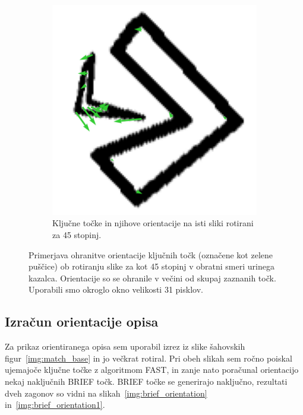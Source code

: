 \documentclass[a4paper,11pt]{article}
\begin{document}
\begin{figure}[hb]
\begin{subfigure}[t]{0.48\textwidth}
		\includegraphics[width=\textwidth]{images/orientations_45.png}
		\caption{Ključne točke in njihove orientacije na isti sliki rotirani za 45 stopinj. }
		\label{img:orientations45}
	\end{subfigure}
	\caption{Primerjava ohranitve orientacije ključnih točk (označene kot zelene puščice) ob rotiranju slike za kot 45 stopinj v obratni smeri urinega kazalca. Orientacije so se ohranile v večini od skupaj zaznanih točk. Uporabili smo okroglo okno velikosti 31 pisklov.}
	\label{img:orientation_comparison}
\end{figure}

\clearpage

\subsection{Izračun orientacije opisa}

Za prikaz orientiranega opisa sem uporabil izrez iz slike šahovskih figur~\ref{img:match_base} in jo večkrat rotiral. Pri obeh slikah sem ročno poiskal ujemajoče ključne točke z algoritmom FAST, in zanje nato poračunal orientacijo nekaj naključnih BRIEF točk. BRIEF točke se generirajo naključno, rezultati dveh zagonov so vidni na slikah~\ref{img:brief_orientation} in~\ref{img:brief_orientation1}.
\end{document}
